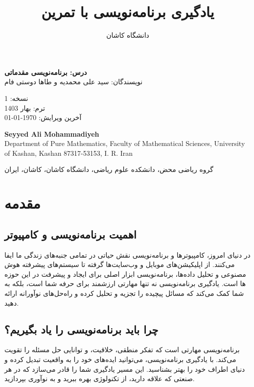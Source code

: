 \documentclass[b5paper,12pt]{article}
\begin{document}
	\title{یادگیری برنامه‌نویسی با تمرین}
	\author{دانشگاه کاشان}
	\date{}
	\maketitle
	\thispagestyle{empty}
	
	\begin{center}
		\textbf{درس: برنامه‌نویسی مقدماتی}\\
		
		نویسندگان: سید علی محمدیه و طاها دوستی فام\\

		\vspace{1cm}
		
	نسخه: 1\\
			ترم: بهار 1403  \\
				آخرین ویرایش: \today\\
				
		\vspace{1cm}


		\begin{LTR}
			\textbf{Seyyed Ali Mohammadiyeh}\\
			Department of Pure Mathematics, Faculty of Mathematical Sciences, University of Kashan, Kashan 87317-53153, I. R. Iran		
		\end{LTR}
		
				گروه ریاضی محض، دانشکده علوم ریاضی، دانشگاه کاشان، کاشان، ایران\\
	\end{center}
	
	
	\newpage
	\section*{مقدمه}
	
	\subsection*{اهمیت برنامه‌نویسی و کامپیوتر}
	در دنیای امروز، کامپیوترها و برنامه‌نویسی نقش حیاتی در تمامی جنبه‌های زندگی ما ایفا می‌کنند. از اپلیکیشن‌های موبایل و وب‌سایت‌ها گرفته تا سیستم‌های پیشرفته هوش مصنوعی و تحلیل داده‌ها، برنامه‌نویسی ابزار اصلی برای ایجاد و پیشرفت در این حوزه ها است. یادگیری برنامه‌نویسی نه تنها مهارتی ارزشمند برای حرفه شما است، بلکه به شما کمک می‌کند که مسائل پیچیده را تجزیه و تحلیل کرده و راه‌حل‌های نوآورانه ارائه دهید.
	
	\subsection*{چرا باید برنامه‌نویسی را یاد بگیریم؟}
	برنامه‌نویسی مهارتی است که تفکر منطقی، خلاقیت، و توانایی حل مسئله را تقویت می‌کند. با یادگیری برنامه‌نویسی، می‌توانید ایده‌های خود را به واقعیت تبدیل کرده و دنیای اطراف خود را بهتر بشناسید. این مسیر یادگیری شما را قادر می‌سازد که در هر صنعتی که علاقه دارید، از تکنولوژی بهره ببرید و به نوآوری بپردازید.
	
\end{document}

